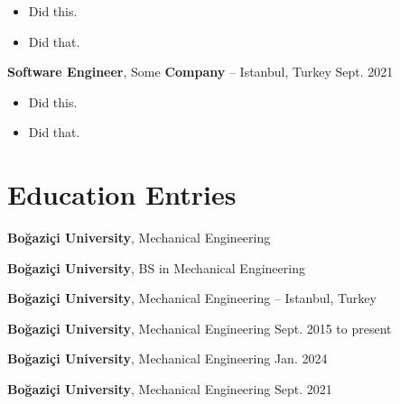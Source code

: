 \documentclass[10pt, letterpaper]{article}
\newenvironment{highlights}{
        \begin{itemize}[
                topsep=0pt,
                partopsep=0pt,
                itemsep=0pt,
                leftmargin=10pt
            ]
    }{
        \end{itemize}
    } %
\begin{document}
        \begin{highlights}
        \item Did this.
        \item Did that.
        \end{highlights}


        \vspace{8pt}

        \textbf{Software Engineer}, Some \textbf{Company} -- Istanbul, Turkey \hfill Sept. 2021

        \begin{highlights}
        \item Did this.
        \item Did that.
        \end{highlights}



    
    \section{Education Entries}

        
        \textbf{Boğaziçi University}, Mechanical Engineering \hfill 



        \vspace{8pt}

        \textbf{Boğaziçi University}, BS in Mechanical Engineering \hfill 



        \vspace{8pt}

        \textbf{Boğaziçi University}, Mechanical Engineering -- Istanbul, Turkey \hfill 



        \vspace{8pt}

        \textbf{Boğaziçi University}, Mechanical Engineering \hfill Sept. 2015 to present



        \vspace{8pt}

        \textbf{Boğaziçi University}, Mechanical Engineering \hfill Jan. 2024



        \vspace{8pt}

        \textbf{Boğaziçi University}, Mechanical Engineering \hfill Sept. 2021
\end{document}
